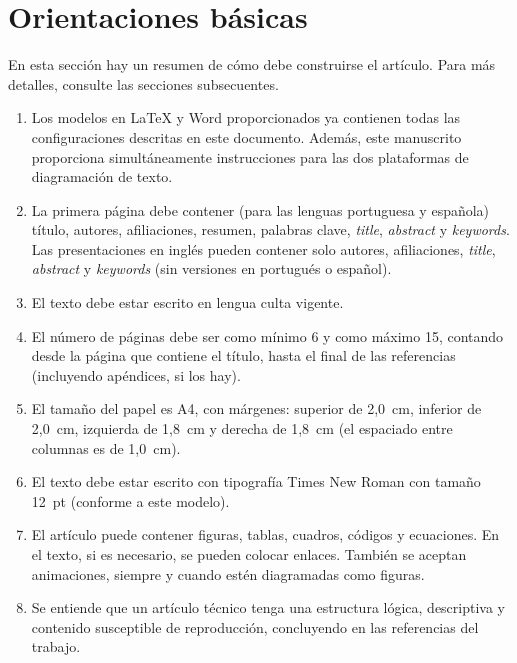 \section{Orientaciones básicas}

En esta sección hay un resumen de cómo debe construirse el artículo. Para más detalles, consulte las secciones subsecuentes.

\vspace{-8pt}
\begin{enumerate} \itemsep=2pt
    \item Los modelos en LaTeX y Word proporcionados ya contienen todas las configuraciones descritas en este documento. Además, este manuscrito proporciona simultáneamente instrucciones para las dos plataformas de diagramación de texto.
	\item La primera página debe contener (para las lenguas portuguesa y española) título, autores, afiliaciones, resumen, palabras clave, \textit{title}, \textit{abstract} y \textit{keywords}. Las presentaciones en inglés pueden contener solo autores, afiliaciones, \textit{title}, \textit{abstract} y \textit{keywords} (sin versiones en portugués o español).
	\item El texto debe estar escrito en lengua culta vigente.
	\item El número de páginas debe ser como mínimo 6 y como máximo 15, contando desde la página que contiene el título, hasta el final de las referencias (incluyendo apéndices, si los hay).
	\item El tamaño del papel es A4, con márgenes: superior de 2,0~cm, inferior de 2,0~cm, izquierda de 1,8~cm y derecha de 1,8~cm (el espaciado entre columnas es de 1,0~cm).
	\item El texto debe estar escrito con tipografía Times New Roman con tamaño 12~pt (conforme a este modelo).
	\item El artículo puede contener figuras, tablas, cuadros, códigos y ecuaciones. En el texto, si es necesario, se pueden colocar enlaces. También se aceptan animaciones, siempre y cuando estén diagramadas como figuras.
	\item Se entiende que un artículo técnico tenga una estructura lógica, descriptiva y contenido susceptible de reproducción, concluyendo en las referencias del trabajo.
\end{enumerate}


